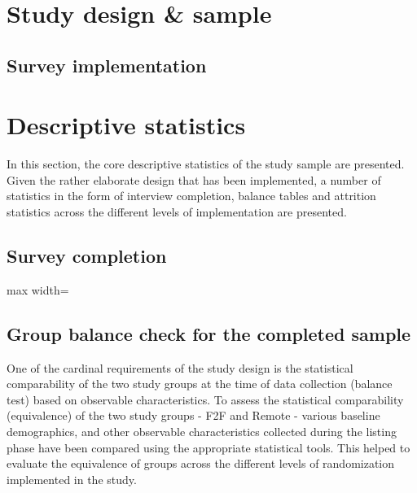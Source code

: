 \documentclass[11pt,harvard]{article}
\begin{document}
	
	\pagebreak
	
	
	\section{Study design \& sample}
	
	\subsection{Survey implementation}
	
	
	\pagebreak
	
	
	\section{Descriptive statistics}
	
	In this section, the core descriptive statistics of the study sample are presented. Given the rather elaborate design that has been implemented, a number of statistics in the form of interview completion, balance tables and attrition statistics across the different levels of implementation are presented.
	
	\subsection{Survey completion}
	
	\begin{table}[htbp]
		\centering
		\begin{adjustbox}{max width=\textwidth}
			\begin{threeparttable}
				\caption{Sample Completion: Face-to-Face vs. Remote}
				\scriptsize
				 
				\label{tab:BF_rCARI_Completion}
			\end{threeparttable}
		\end{adjustbox}
	\end{table}
	
	\subsection{Group balance check for the completed sample}
	
	One of the cardinal requirements of the study design is the statistical comparability of the two study groups at the time of data collection (balance test) based on observable characteristics. To assess the statistical comparability (equivalence) of the two study groups - F2F and Remote - various baseline demographics, and other observable characteristics collected during the listing phase have been compared using the appropriate statistical tools. This helped to evaluate the equivalence of groups across the different levels of randomization implemented in the study. 
	
\end{document}
